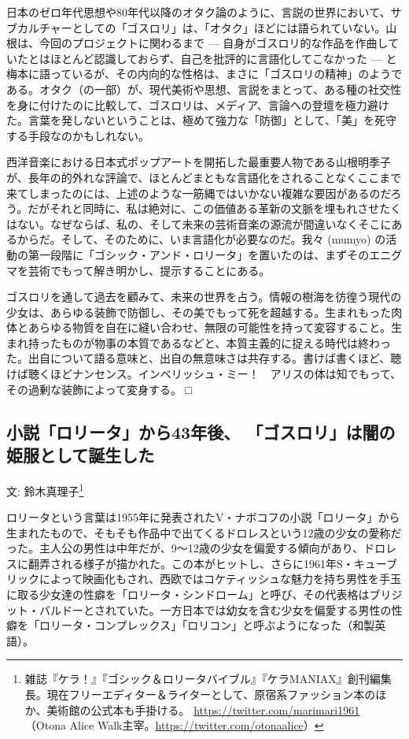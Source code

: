 \documentclass[a6paper, 9pt, openright, titlepage, twoside]{ltjsarticle}
\begin{document}
日本のゼロ年代思想や80年代以降のオタク論のように、言説の世界において、サブカルチャーとしての「ゴスロリ」は、「オタク」ほどには語られていない。山根は、今回のプロジェクトに関わるまで --- 自身がゴスロリ的な作品を作曲していたとはほとんど認識しておらず、自己を批評的に言語化してこなかった --- と梅本に語っているが、その内向的な性格は、まさに「ゴスロリの精神」のようである。オタク（の一部）が、現代美術や思想、言説をまとって、ある種の社交性を身に付けたのに比較して、ゴスロリは、メディア、言論への登壇を極力避けた。言葉を発しないということは、極めて強力な「防御」として、「美」を死守する手段なのかもしれない。

西洋音楽における日本式ポップアートを開拓した最重要人物である山根明季子が、長年の的外れな評論で、ほとんどまともな言語化をされることなくここまで来てしまったのには、上述のような一筋縄ではいかない複雑な要因があるのだろう。だがそれと同時に、私は絶対に、この価値ある革新の文脈を埋もれさせたくはない。なぜならば、私の、そして未来の芸術音楽の源流が間違いなくそこにあるからだ。そして、そのために、いま言語化が必要なのだ。我々 (mumyo) の活動の第一段階に「ゴシック・アンド・ロリータ」を置いたのは、まずそのエニグマを芸術でもって解き明かし、提示することにある。

ゴスロリを通して過去を顧みて、未来の世界を占う。情報の樹海を彷徨う現代の少女は、あらゆる装飾で防御し、その美でもって死を超越する。生まれもった肉体とあらゆる物質を自在に縫い合わせ、無限の可能性を持って変容すること。生まれ持ったものが物事の本質であるなどと、本質主義的に捉える時代は終わった。出自について語る意味と、出自の無意味さは共存する。書けば書くほど、聴けば聴くほどナンセンス。インベリッシュ・ミー！　アリスの体は知でもって、その過剰な装飾によって変身する。 □ 

\newpage


\subsection*{小説「ロリータ」から43年後、 「ゴスロリ」は闇の姫服として誕生した}\label{suzuki}
{\small 文: 鈴木真理子}\footnote{雑誌『ケラ！』『ゴシック＆ロリータバイブル』『ケラMANIAX』創刊編集長。現在フリーエディター＆ライターとして、原宿系ファッション本のほか、美術館の公式本も手掛ける。
\url{https://twitter.com/marimari1961}
（Otona Alice Walk主宰。\url{https://twitter.com/otonaalice}）}  

ロリータという言葉は1955年に発表されたV・ナボコフの小説「ロリータ」から生まれたもので、そもそも作品中で出てくるドロレスという12歳の少女の愛称だった。主人公の男性は中年だが、9～12歳の少女を偏愛する傾向があり、ドロレスに翻弄される様子が描かれた。この本がヒットし、さらに1961年S・キューブリックによって映画化もされ、西欧ではコケティッシュな魅力を持ち男性を手玉に取る少女達の性癖を「ロリータ・シンドローム」と呼び、その代表格はブリジット・バルドーとされていた。一方日本では幼女を含む少女を偏愛する男性の性癖を「ロリータ・コンプレックス」「ロリコン」と呼ぶようになった（和製英語）。
\end{document}
